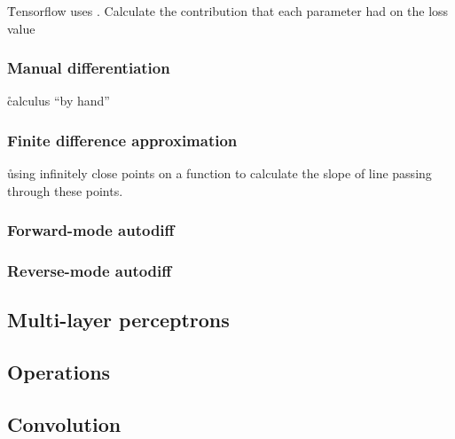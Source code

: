 \r{Tensorflow uses .  Calculate the contribution that each parameter had on the loss value}

\subsubsection{Manual differentiation}

\r{calculus ``by hand''}

\subsubsection{Finite difference approximation}

\r{using infinitely close points on a function to calculate the slope of line passing through these points.}



\subsubsection{Forward-mode autodiff}



\subsubsection{Reverse-mode autodiff}


\subsection{Multi-layer perceptrons}


\subsection{Operations}

\subsection{Convolution}

